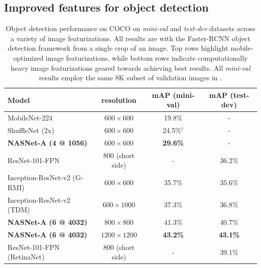 
\subsection{Improved features for object detection}

\begin{table}[h!]
\centering
\small
\begin{tabular}{lc|cc}
\toprule
{\bf Model} & {\bf resolution} & {\bf mAP (mini-val)} & {\bf mAP (test-dev)} \\
\midrule
MobileNet-224 \cite{howard2017mobilenets} & $600\times600$ & 19.8\% & -  \\
ShuffleNet (2x) \cite{shufflenet} & $600\times600$  & 24.5\%$^\dagger$ & - \\ 
\textbf{NASNet-A (4 @ 1056)} & $600\times600$ & \textbf{29.6\%} & - \\
\midrule
ResNet-101-FPN \cite{lin2016feature} & 800 (short side) & - & 36.2\% \\
Inception-ResNet-v2 (G-RMI) \cite{huang2016speed} & $600\times600$ & 35.7\% & 35.6\% \\
Inception-ResNet-v2 (TDM) \cite{shrivastava2016beyond} & $600\times1000$ & 37.3\% & 36.8\% \\
\textbf{NASNet-A (6 @ 4032)} & $800\times800$ & 41.3\% & 40.7\% \\
\textbf{NASNet-A (6 @ 4032)} & $1200\times1200$ & \textbf{43.2\%} & {\bf 43.1\%} \\
\midrule
ResNet-101-FPN (RetinaNet) \cite{lin2017focal} & 800 (short side) & - & 39.1\%  \\
\bottomrule
\end{tabular}
\vspace{0.2cm}
\caption{Object detection performance on COCO on {\it mini-val} and {\it test-dev} datasets across a variety of image featurizations. All results are with the Faster-RCNN object detection framework \cite{faster_rcnn} from a single crop of an image. Top rows highlight mobile-optimized image featurizations, while bottom rows indicate computationally heavy image featurizations geared towards achieving best results. All {\it mini-val} results employ the same 8K subset of validation images in \cite{huang2016speed}.}
\label{table:mscoco}
\end{table}

